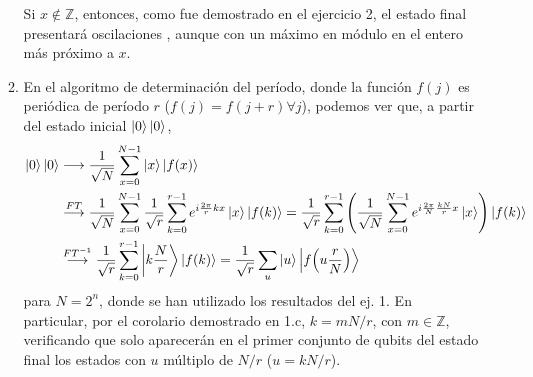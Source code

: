 \documentclass{scrartcl}
\newcommand{\inv}[1]{\frac{1}{#1}}
\DeclareRobustCommand{\[}{\begin{equation}}
\DeclareRobustCommand{\]}{\end{equation}}
\begin{document}
\begin{enumerate}
\begin{enumerate}
        Si $x \not\in \mathds{Z}$, entonces, como fue demostrado en el ejercicio 2, el estado final presentará oscilaciones , aunque con un máximo en módulo en el entero más próximo a $x$.
        
        
        \item En el algoritmo de determinación del período, donde la función $f(j)$ es periódica de período $r$ ($f(j) = f(j + r) \forall j$), podemos ver que, a partir del estado inicial $\ket{0}\ket{0}$,
        \begin{align}
            \ket{0}\ket{0} &\longrightarrow \inv{\sqrt{N}} \sum_{x = 0}^{N - 1} \ket{x}\ket{f(x)} \\
                &\overset{FT}{\longrightarrow} \inv{\sqrt{N}} \sum_{x = 0}^{N - 1} \inv{\sqrt{r}} \sum_{k = 0}^{r - 1} e^{i \frac{2\pi}{r} kx} \ket{x} \ket{f(k)} = \inv{\sqrt{r}} \sum_{k = 0}^{r - 1} \left( \inv{\sqrt{N}} \sum_{x = 0}^{N - 1} e^{i \frac{2\pi}{N} \frac{kN}{r} x} \ket{x} \right) \ket{f(k)} \\
                &\overset{FT^{-1}}{\longrightarrow} \inv{\sqrt{r}} \sum_{k = 0}^{r - 1} \ket{k \frac{N}{r}} \ket{f(k)} = \inv{\sqrt{r}} \sum_{u} \ket{u} \ket{f\qty(u \frac{r}{N})}
        \end{align}
        para $N = 2^n$, donde se han utilizado los resultados del ej. 1. En particular, por el corolario demostrado en 1.c, $k = m N / r$, con $m \in \mathds{Z}$, verificando que solo aparecerán en el primer conjunto de qubits del estado final los estados con $u$ múltiplo de $N / r$ ($u = k N/r$).
        
    \end{enumerate}
    
    
    

\end{enumerate}
\end{document}
